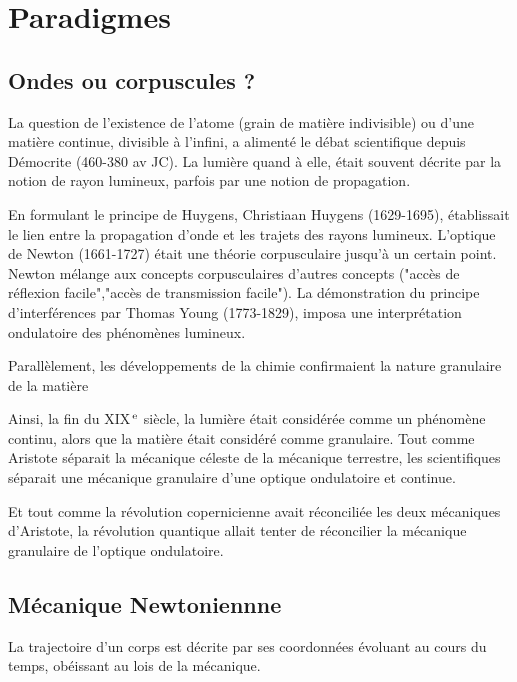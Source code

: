
\section{Paradigmes}

\subsection{Ondes ou corpuscules ?}

La question de l'existence de l'atome (grain de matière indivisible) ou d'une matière continue, divisible à l'infini, a alimenté le débat scientifique depuis Démocrite (460-380 av JC). La lumière quand à elle, était souvent décrite par la notion de rayon lumineux, parfois par une notion de propagation.

En formulant le principe de Huygens, Christiaan Huygens (1629-1695), établissait le lien entre la propagation d'onde et les trajets des rayons lumineux.
L'optique de Newton (1661-1727) était une théorie corpusculaire jusqu'à un certain point. Newton mélange aux concepts corpusculaires d'autres concepts ("accès de réflexion facile","accès de transmission facile").
La démonstration du principe d'interférences par Thomas Young (1773-1829), imposa une interprétation ondulatoire des phénomènes lumineux.

Parallèlement, les développements de la chimie confirmaient la nature granulaire de la matière

Ainsi, la fin du XIX$^\text{\,e}$ siècle, la lumière était considérée comme un phénomène continu, alors que la matière était considéré comme granulaire. Tout comme Aristote séparait la mécanique céleste de la mécanique terrestre, les scientifiques séparait une mécanique granulaire d'une optique ondulatoire et continue.

Et tout comme la révolution copernicienne avait réconciliée les deux mécaniques d'Aristote, la révolution quantique allait tenter de réconcilier la mécanique granulaire de l'optique ondulatoire.



\subsection{Mécanique Newtoniennne}
%
La trajectoire d'un corps est décrite par ses coordonnées évoluant au cours du temps, obéissant au lois de la mécanique.
%
